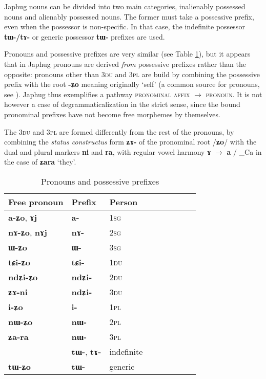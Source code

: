 \documentclass[oldfontcommands,oneside,a4paper,11pt]{article}
\newcommand{\ipa}[1]{\mbox{\phon\textbf{#1}}} %
\begin{document}
Japhug  nouns can be divided into two main categories, inalienably possessed nouns and alienably possessed nouns. The former must take a possessive prefix, even when the possessor is non-specific. In that case, the indefinite possessor \ipa{tɯ-/tɤ-} or generic possessor \ipa{tɯ-} prefixes are used.

Pronouns  and possessive prefixes are very similar (see Table \ref{tab:pronoun}), but it appears that in Japhug pronouns are derived \textit{from} possessive prefixes rather than the opposite: pronouns other than \textsc{3du} and \textsc{3pl} are build by combining the possessive prefix with the root \ipa{-ʑo} meaning originally `self' (a common source for pronouns, see \citealt{heine11pronoms}). Japhug thus exemplifies a pathway \textsc{pronominal affix} $\rightarrow$ \textsc{pronoun}. It is not however a case of degrammaticalization in the strict sense, since the bound pronominal prefixes have not become free morphemes by themselves.

The \textsc{3du} and \textsc{3pl} are formed differently from the rest of the pronouns, by combining the \textit{status constructus} form \ipa{ʑɤ-} of the pronominal root /\ipa{ʑo}/ with the dual and plural markers \ipa{ni} and \ipa{ra}, with regular vowel harmony \ipa{ɤ} $\rightarrow$ \ipa{a} / \_Ca in the case of \ipa{ʑara} `they'.
 
 \begin{table}[H] \centering
\caption{Pronouns and possessive prefixes }\label{tab:pronoun}
\begin{tabular}{lllllllll} 
\toprule
 Free pronoun & Prefix & Person\\
\midrule
 \ipa{a-ʑo},    \ipa{ɤj} &	\ipa{a-}  &		1\textsc{sg} \\
\ipa{nɤ-ʑo},  \ipa{nɤj} &	\ipa{nɤ-}  &			2\textsc{sg}\\
\ipa{ɯ-ʑo}  &	\ipa{ɯ-}  &			3\textsc{sg}\\
\midrule
\ipa{tɕi-ʑo}  &	\ipa{tɕi-}  &			1\textsc{du} \\
\ipa{ndʑi-ʑo}  &	\ipa{ndʑi-}  &		2\textsc{du} \\	
\ipa{ʑɤ-ni}  &	\ipa{ndʑi-}  &		3\textsc{du} \\	
\midrule
\ipa{i-ʑo}    &	\ipa{i-}  &			1\textsc{pl} \\
\ipa{nɯ-ʑo}   &	\ipa{nɯ-}  &			2\textsc{pl} \\
\ipa{ʑa-ra}  &	\ipa{nɯ-}  &			3\textsc{pl} \\
\midrule
&  \ipa{tɯ-},  \ipa{tɤ-} & indefinite \\
\ipa{tɯ-ʑo} & \ipa{tɯ-}   &  generic\\
\bottomrule
\end{tabular}
\end{table}
 
\end{document}
